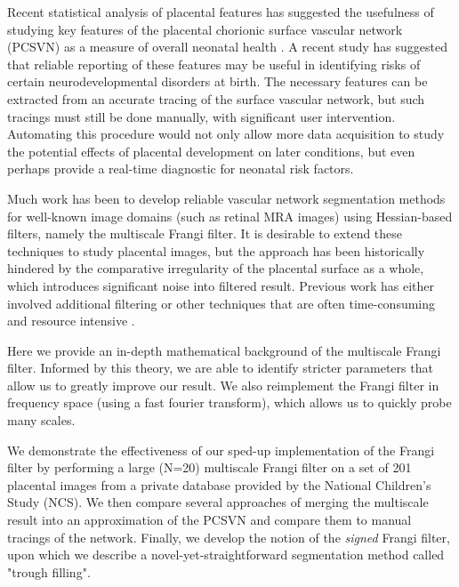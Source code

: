 

Recent statistical analysis of placental features has suggested the usefulness
of studying key features of the placental chorionic surface vascular network
(PCSVN) as a measure of overall neonatal health \cite{chang2017}. A recent
study has suggested that reliable reporting of these features may be useful in
identifying risks of certain neurodevelopmental disorders at birth. The
necessary features can be extracted from an accurate tracing of the surface
vascular network, but such tracings must still be done manually, with
significant user intervention. Automating this procedure would not only allow
more data acquisition to study the potential effects of placental development on
later conditions, but even perhaps provide a real-time diagnostic for neonatal
risk factors.

Much work has been to develop reliable vascular network segmentation methods for
well-known image domains (such as retinal MRA images) using Hessian-based
filters, namely the multiscale Frangi filter. It is desirable to extend these
techniques to study placental images, but the approach has been historically
hindered by the comparative irregularity of the placental surface as a whole,
which introduces significant noise into filtered result.  Previous work has either
involved additional filtering \cite{huynh2013filter} or other techniques that are
often time-consuming and resource intensive \cite{djima2017enhancing}.

Here we provide an in-depth mathematical background of the multiscale Frangi filter.
Informed by this theory, we are able to identify stricter parameters that allow us
to greatly improve our result. We also reimplement the Frangi filter in frequency space
(using a fast fourier transform), which allows us to quickly probe many scales.

We demonstrate the effectiveness of our sped-up implementation of the Frangi
filter by performing a large (N=20) multiscale Frangi filter on a set of 201
placental images from a private database provided by the National Children's
Study (NCS). We then compare several approaches of merging the multiscale
result into an approximation of the PCSVN and compare them to manual tracings
of the network. Finally, we develop the notion of the \textit{signed} Frangi filter,
upon which we describe a novel-yet-straightforward segmentation method called "trough filling".


